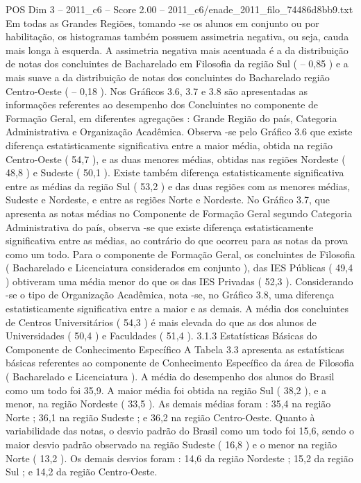 \begin{textsample}{POS Dim 3 – 2011\_c6 – Score 2.00 – 2011\_c6/enade\_2011\_filo\_74486d8bb9.txt}
Em todas as Grandes Regiões, tomando -se os alunos em conjunto ou por habilitação, os histogramas também possuem assimetria negativa, ou seja, cauda mais longa à esquerda.
A assimetria negativa mais acentuada é a da distribuição de notas dos concluintes de Bacharelado em Filosofia da região Sul ( – 0,85 ) e a mais suave a da distribuição de notas dos concluintes do Bacharelado região Centro-Oeste ( – 0,18 ).
Nos Gráficos 3.6, 3.7 e 3.8 são apresentadas as informações referentes ao desempenho dos Concluintes no componente de Formação Geral, em diferentes agregações : Grande Região do país, Categoria Administrativa e Organização Acadêmica.
Observa -se pelo Gráfico 3.6 que existe diferença estatisticamente significativa entre a maior média, obtida na região Centro-Oeste ( 54,7 ), e as duas menores médias, obtidas nas regiões Nordeste ( 48,8 ) e Sudeste ( 50,1 ).
Existe também diferença estatisticamente significativa entre as médias da região Sul ( 53,2 ) e das duas regiões com as menores médias, Sudeste e Nordeste, e entre as regiões Norte e Nordeste.
No Gráfico 3.7, que apresenta as notas médias no Componente de Formação Geral segundo Categoria Administrativa do país, observa -se que existe diferença estatisticamente significativa entre as médias, ao contrário do que ocorreu para as notas da prova como um todo.
Para o componente de Formação Geral, os concluintes de Filosofia ( Bacharelado e Licenciatura considerados em conjunto ), das IES Públicas ( 49,4 ) obtiveram uma média menor do que os das IES Privadas ( 52,3 ).
Considerando -se o tipo de Organização Acadêmica, nota -se, no Gráfico 3.8, uma diferença estatisticamente significativa entre a maior e as demais.
A média dos concluintes de Centros Universitários ( 54,3 ) é mais elevada do que as dos alunos de Universidades ( 50,4 ) e Faculdades ( 51,4 ). 3.1.3 Estatísticas Básicas do Componente de Conhecimento Específico A Tabela 3.3 apresenta as estatísticas básicas referentes ao componente de Conhecimento Específico da área de Filosofia ( Bacharelado e Licenciatura ).
A média do desempenho dos alunos do Brasil como um todo foi 35,9.
A maior média foi obtida na região Sul ( 38,2 ), e a menor, na região Nordeste ( 33,5 ).
As demais médias foram : 35,4 na região Norte ; 36,1 na região Sudeste ; e 36,2 na região Centro-Oeste.
Quanto à variabilidade das notas, o desvio padrão do Brasil como um todo foi 15,6, sendo o maior desvio padrão observado na região Sudeste ( 16,8 ) e o menor na região Norte ( 13,2 ).
Os demais desvios foram : 14,6 da região Nordeste ; 15,2 da região Sul ; e 14,2 da região Centro-Oeste.

\end{textsample}
